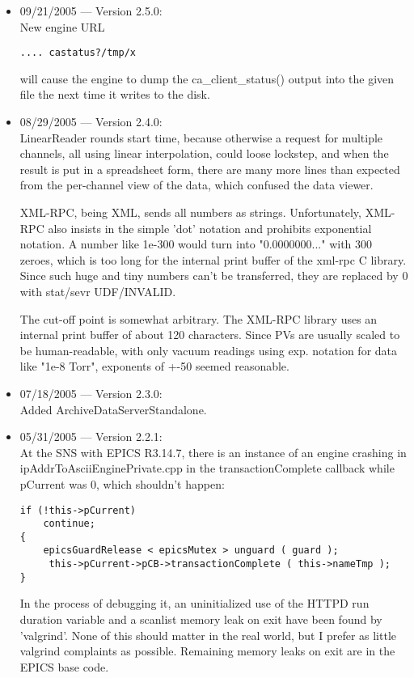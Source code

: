 \begin{itemize}
\item 09/21/2005 --- Version 2.5.0:\\
New engine URL
\begin{verbatim}
.... castatus?/tmp/x
\end{verbatim}
will cause the engine to dump the ca\_client\_status() output
into the given file the next time it writes to the disk.

\item 08/29/2005 --- Version 2.4.0:\\
LinearReader rounds start time,
because otherwise a request for multiple channels,
all using linear interpolation, could loose
lockstep, and when the result is put in a spreadsheet
form, there are many more lines than expected
from the per-channel view of the data,
which confused the data viewer.

XML-RPC, being XML, sends all numbers as strings.
Unfortunately, XML-RPC also insists in the simple 'dot'
notation and prohibits exponential notation.
A number like 1e-300 would turn into
"0.0000000..." with 300 zeroes,
which is too long for the internal print buffer of
the xml-rpc C library.
Since such huge and tiny numbers can't be transferred,
they are replaced by 0 with stat/sevr UDF/INVALID.

The cut-off point is somewhat arbitrary.
The XML-RPC library uses an internal print buffer
of about 120 characters.
Since PVs are usually scaled to be human-readable,
with only vacuum readings using exp. notation for
data like "1e-8 Torr", exponents of +-50 seemed
reasonable.

\item 07/18/2005 --- Version 2.3.0:\\
Added ArchiveDataServerStandalone.

\item 05/31/2005 --- Version 2.2.1:\\
At the SNS with EPICS R3.14.7, there is an instance of an engine crashing in
ipAddrToAsciiEnginePrivate.cpp in the transactionComplete callback while
pCurrent was 0, which shouldn't happen:
\begin{verbatim}
if (!this->pCurrent)
    continue;
{
    epicsGuardRelease < epicsMutex > unguard ( guard );
     this->pCurrent->pCB->transactionComplete ( this->nameTmp );
}
\end{verbatim}

In the process of debugging it, an uninitialized use of the HTTPD run duration
variable and a scanlist memory leak on exit have been found by 'valgrind'.
None of this should matter in the real world, but I prefer as little valgrind
complaints as possible. Remaining memory leaks on exit are in the EPICS base
code.


\end{itemize}
